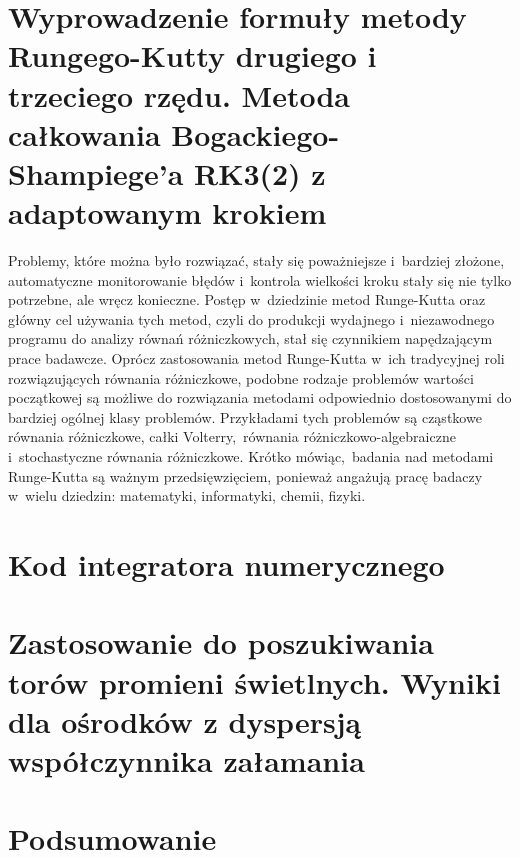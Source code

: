 \documentclass[a4paper,12pkt]{report}
\begin{document}
\chapter{Wyprowadzenie formuły metody Rungego-Kutty drugiego i trzeciego rzędu. Metoda całkowania Bogackiego-Shampiege'a RK3(2) z adaptowanym krokiem}

\indent Problemy, które można było rozwiązać, stały się poważniejsze i~bardziej złożone, automatyczne monitorowanie błędów i~kontrola wielkości kroku stały się nie tylko potrzebne, ale wręcz konieczne. Postęp w~dziedzinie metod Runge-Kutta oraz główny cel używania tych metod, czyli do produkcji wydajnego i~niezawodnego programu do analizy równań różniczkowych, stał się czynnikiem napędzającym prace badawcze. Oprócz zastosowania metod Runge-Kutta w~ich tradycyjnej roli rozwiązujących równania różniczkowe, podobne rodzaje problemów wartości początkowej są możliwe do rozwiązania metodami odpowiednio dostosowanymi do bardziej ogólnej klasy problemów. Przykładami tych problemów są cząstkowe równania różniczkowe, całki Volterry,~równania różniczkowo-algebraiczne i~stochastyczne równania różniczkowe. Krótko mówiąc,~badania nad metodami Runge-Kutta są ważnym przedsięwzięciem, ponieważ angażują pracę badaczy w~wielu dziedzin: matematyki, informatyki, chemii, fizyki.



\chapter{Kod integratora numerycznego}



\chapter{Zastosowanie do poszukiwania torów promieni świetlnych. Wyniki dla ośrodków z dyspersją współczynnika załamania}



\chapter{Podsumowanie}
\end{document}
